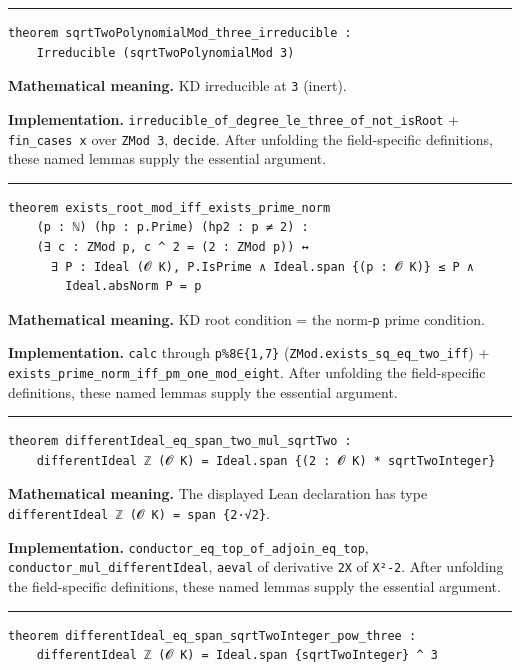 \documentclass[UTF8,a4paper,11pt,fontset=fandol]{ctexart}
\theoremstyle{definition}
\newcommand{\statementsep}{\par\medskip\hrule\medskip}
\begin{document}
\statementsep
\begin{verbatim}
theorem sqrtTwoPolynomialMod_three_irreducible :
    Irreducible (sqrtTwoPolynomialMod 3)
\end{verbatim}
\noindent\textbf{Mathematical meaning.} KD irreducible at \texttt{3} (inert).\par
\noindent\textbf{Implementation.} \texttt{irreducible\_\allowbreak{}of\_\allowbreak{}degree\_\allowbreak{}le\_\allowbreak{}three\_\allowbreak{}of\_\allowbreak{}not\_\allowbreak{}isRoot} + \texttt{fin\_\allowbreak{}cases x} over \texttt{ZMod 3}, \texttt{decide}. After unfolding the field-specific definitions, these named lemmas supply the essential argument.\par
\statementsep
\begin{verbatim}
theorem exists_root_mod_iff_exists_prime_norm
    (p : ℕ) (hp : p.Prime) (hp2 : p ≠ 2) :
    (∃ c : ZMod p, c ^ 2 = (2 : ZMod p)) ↔
      ∃ P : Ideal (𝓞 K), P.IsPrime ∧ Ideal.span {(p : 𝓞 K)} ≤ P ∧
        Ideal.absNorm P = p
\end{verbatim}
\noindent\textbf{Mathematical meaning.} KD root condition = the norm-\texttt{p} prime condition.\par
\noindent\textbf{Implementation.} \texttt{calc} through \texttt{p\%8∈\{1,7\}} (\texttt{ZMod.\allowbreak{}exists\_\allowbreak{}sq\_\allowbreak{}eq\_\allowbreak{}two\_\allowbreak{}iff}) + \texttt{exists\_\allowbreak{}prime\_\allowbreak{}norm\_\allowbreak{}iff\_\allowbreak{}pm\_\allowbreak{}one\_\allowbreak{}mod\_\allowbreak{}eight}. After unfolding the field-specific definitions, these named lemmas supply the essential argument.\par
\statementsep
\begin{verbatim}
theorem differentIdeal_eq_span_two_mul_sqrtTwo :
    differentIdeal ℤ (𝓞 K) = Ideal.span {(2 : 𝓞 K) * sqrtTwoInteger}
\end{verbatim}
\noindent\textbf{Mathematical meaning.} The displayed Lean declaration has type \texttt{differentIdeal ℤ (𝓞 K) = span \{2·√2\}}.\par
\noindent\textbf{Implementation.} \texttt{conductor\_\allowbreak{}eq\_\allowbreak{}top\_\allowbreak{}of\_\allowbreak{}adjoin\_\allowbreak{}eq\_\allowbreak{}top}, \texttt{conductor\_\allowbreak{}mul\_\allowbreak{}differentIdeal}, \texttt{aeval} of derivative \texttt{2X} of \texttt{X²-2}. After unfolding the field-specific definitions, these named lemmas supply the essential argument.\par
\statementsep
\begin{verbatim}
theorem differentIdeal_eq_span_sqrtTwoInteger_pow_three :
    differentIdeal ℤ (𝓞 K) = Ideal.span {sqrtTwoInteger} ^ 3
\end{verbatim}
\end{document}
